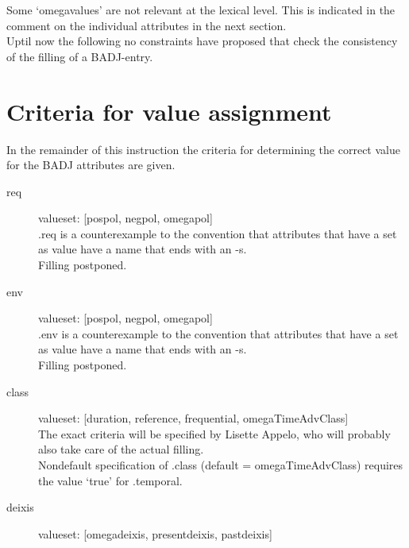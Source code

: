 Some `omegavalues' are not relevant at the lexical level. This is indicated
in the comment on the individual attributes in the next section.\\

Uptil now the following no constraints have proposed that check the consistency 
of the filling of a BADJ-entry.

\section{Criteria for value assignment}
In the remainder of this instruction the criteria for 
determining the correct value for the BADJ attributes are given.

\newpage

\begin{description}
\item
[req]\mbox{}

valueset: [pospol, negpol, omegapol]\\

.req is a counterexample to the convention that attributes that have a set
as value have a name that ends with an -s. \\

Filling postponed.

\newpage
\item 
[env]\mbox{}

valueset: [pospol, negpol, omegapol]\\

.env is a counterexample to the convention that attributes that have a set
as value have a name that ends with an -s. \\

Filling postponed.

\newpage
\item 
[class]\mbox{}

valueset: [duration, reference, frequential, omegaTimeAdvClass]\\


The exact criteria will be specified by Lisette Appelo, who will probably also
take care of the actual filling. \\
Nondefault specification of .class (default = omegaTimeAdvClass) 
requires the value `true' for .temporal.

\newpage
\item 
[deixis]\mbox{}

valueset: [omegadeixis, presentdeixis, pastdeixis]\\



\end{description}
